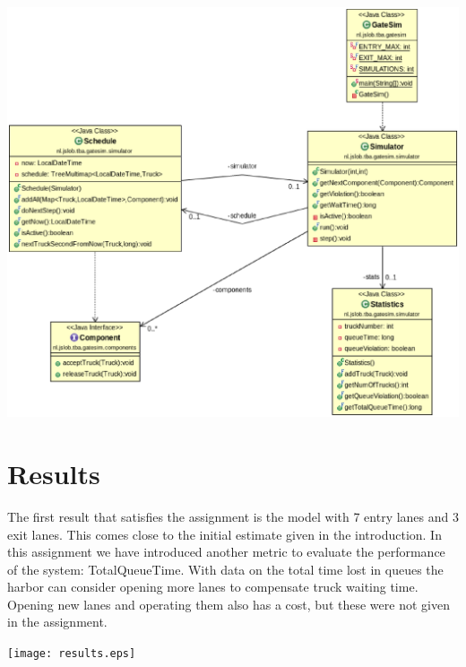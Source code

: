 \documentclass{article}
\begin{document}
\includegraphics[scale=0.4]{Simulator.eps}

\section{Results}

The first result that satisfies the assignment is the model with 7
entry lanes and 3 exit lanes. This comes close to the initial estimate
given in the introduction. In this assignment we have introduced
another metric to evaluate the performance of the system:
TotalQueueTime. With data on the total time lost in queues the harbor
can consider opening more lanes to compensate truck waiting
time. Opening new lanes and operating them also has a cost, but these
were not given in the assignment.

\texttt{[image: results.eps]}
\end{document}
